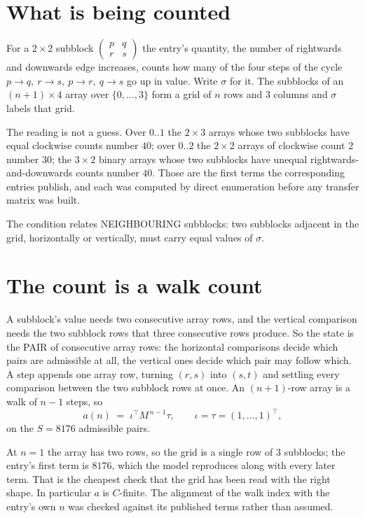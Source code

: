 \documentclass[11pt,a4paper]{article}
\theoremstyle{plain}
\theoremstyle{definition}
\begin{document}
\section{What is being counted}

For a $2\times2$ subblock $\begin{pmatrix}p&q\\r&s\end{pmatrix}$ the
entry's quantity, the number of rightwards and downwards edge increases, counts how many of the four steps of the cycle $p\to q,\ r\to s,\ p\to r,\ q\to s$ go up in value. Write $\sigma$ for it. The subblocks of an
$(n+1)\times4$ array over $\{0,\dots,3\}$ form a grid of $n$ rows and $3$
columns and $\sigma$ labels that grid.

The reading is not a guess. Over $0..1$ the $2\times3$ arrays whose two subblocks have equal
clockwise counts number $40$; over $0..2$ the $2\times2$ arrays of clockwise count $2$ number
$30$; the $3\times2$ binary arrays whose two subblocks have unequal rightwards-and-downwards
counts number $40$. Those are the first terms the corresponding entries publish, and each was
computed by direct enumeration before any transfer matrix was built.

The condition relates NEIGHBOURING subblocks: two subblocks adjacent in the grid, horizontally
or vertically, must carry equal values of $\sigma$.

\section{The count is a walk count}

A subblock's value needs two consecutive array rows, and the vertical
comparison needs the two subblock rows that three consecutive rows produce. So the state is the
PAIR of consecutive array rows: the horizontal comparisons decide which pairs are admissible at
all, the vertical ones decide which pair may follow which. A step appends one array row,
turning $(r,s)$ into $(s,t)$ and settling every comparison between the two subblock rows at
once. An $(n+1)$-row array is a walk of $n-1$ steps, so
\[
a(n)\;=\;\iota^{\!\top}M^{\,n-1}\tau,\qquad\iota=\tau=(1,\dots,1)^{\!\top},
\]
on the $S=8176$ admissible pairs.

At $n=1$ the array has two rows, so the grid is a single row of $3$
subblocks; the entry's first term is $8176$, which the model
reproduces along with every later term. That is the cheapest check that the grid has been read
with the right shape.
In particular $a$ is $C$-finite. The alignment of the walk index with the entry's own $n$ was
checked against its published terms rather than assumed.
\end{document}
